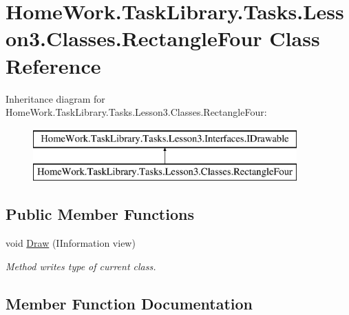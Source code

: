 \hypertarget{class_home_work_1_1_task_library_1_1_tasks_1_1_lesson3_1_1_classes_1_1_rectangle_four}{}\section{Home\+Work.\+Task\+Library.\+Tasks.\+Lesson3.\+Classes.\+Rectangle\+Four Class Reference}
\label{class_home_work_1_1_task_library_1_1_tasks_1_1_lesson3_1_1_classes_1_1_rectangle_four}
Inheritance diagram for Home\+Work.\+Task\+Library.\+Tasks.\+Lesson3.\+Classes.\+Rectangle\+Four\+:\begin{figure}[H]
\begin{center}
\leavevmode
\includegraphics[height=2.000000cm]{class_home_work_1_1_task_library_1_1_tasks_1_1_lesson3_1_1_classes_1_1_rectangle_four}
\end{center}
\end{figure}
\subsection*{Public Member Functions}
\begin{DoxyCompactItemize}
\item 
void \mbox{\hyperlink{class_home_work_1_1_task_library_1_1_tasks_1_1_lesson3_1_1_classes_1_1_rectangle_four_a4e85c8eec4572cfbf0a0bb56858281f8}{Draw}} (I\+Information view)
\begin{DoxyCompactList}\small\item\em Method writes type of current class. \end{DoxyCompactList}\end{DoxyCompactItemize}


\subsection{Member Function Documentation}
\mbox{\label{class_home_work_1_1_task_library_1_1_tasks_1_1_lesson3_1_1_classes_1_1_rectangle_four_a4e85c8eec4572cfbf0a0bb56858281f8}} 
